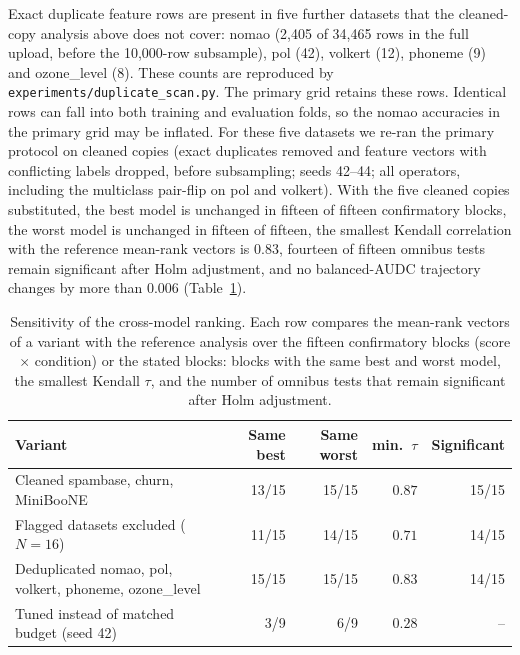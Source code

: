 \documentclass[pdflatex,sn-mathphys]{sn-jnl}
\theoremstyle{thmstyleone}
\theoremstyle{thmstyletwo}
\theoremstyle{thmstylethree}
\begin{document}
Exact duplicate feature rows are present in five further datasets that the cleaned-copy analysis above does not cover: nomao (2,405 of 34,465 rows in the full upload, before the 10,000-row subsample), pol (42), volkert (12), phoneme (9) and ozone\_level (8). These counts are reproduced by \texttt{experiments/duplicate\_scan.py}. The primary grid retains these rows. Identical rows can fall into both training and evaluation folds, so the nomao accuracies in the primary grid may be inflated. For these five datasets we re-ran the primary protocol on cleaned copies (exact duplicates removed and feature vectors with conflicting labels dropped, before subsampling; seeds 42--44; all operators, including the multiclass pair-flip on pol and volkert). With the five cleaned copies substituted, the best model is unchanged in fifteen of fifteen confirmatory blocks, the worst model is unchanged in fifteen of fifteen, the smallest Kendall correlation with the reference mean-rank vectors is $0.83$, fourteen of fifteen omnibus tests remain significant after Holm adjustment, and no balanced-AUDC trajectory changes by more than $0.006$ (Table~\ref{tab:sensitivity}).

\begin{table}[t]
\centering
\footnotesize
\caption{Sensitivity of the cross-model ranking. Each row compares the mean-rank vectors of a variant with the reference analysis over the fifteen confirmatory blocks (score $\times$ condition) or the stated blocks: blocks with the same best and worst model, the smallest Kendall $\tau$, and the number of omnibus tests that remain significant after Holm adjustment.}
\label{tab:sensitivity}
\begin{tabular}{@{}p{4.6cm}rrrr@{}}
\toprule
Variant & Same best & Same worst & min.\ $\tau$ & Significant \\
\midrule
Cleaned spambase, churn, MiniBooNE & 13/15 & 15/15 & $0.87$ & 15/15 \\
Flagged datasets excluded ($N=16$) & 11/15 & 14/15 & $0.71$ & 14/15 \\
Deduplicated nomao, pol, volkert, phoneme, ozone\_level & 15/15 & 15/15 & $0.83$ & 14/15 \\
Tuned instead of matched budget (seed 42) & 3/9 & 6/9 & $0.28$ & -- \\
\bottomrule
\end{tabular}
\end{table}
\end{document}
